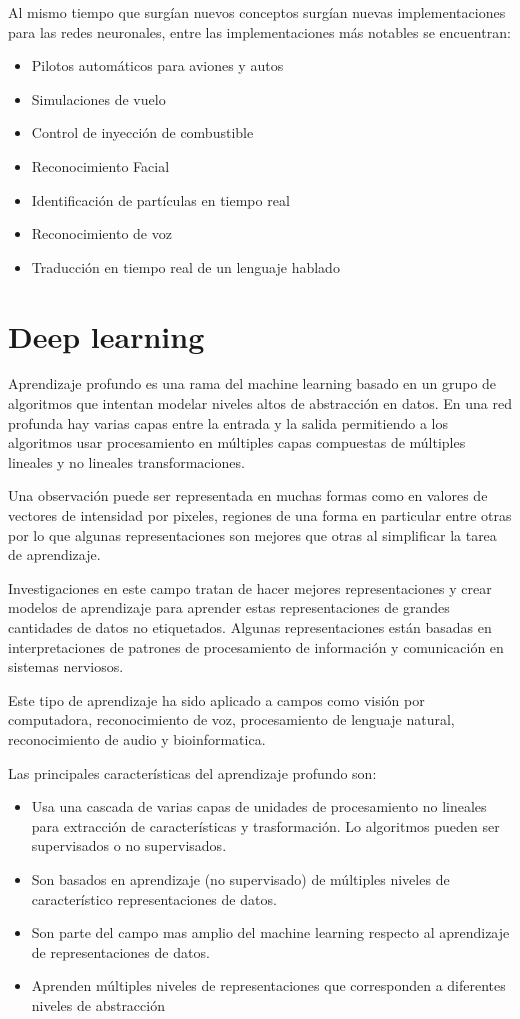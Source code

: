 \documentclass{article}
\begin{document}
Al mismo tiempo que surgían nuevos conceptos surgían nuevas implementaciones para las redes neuronales, entre las implementaciones más notables se encuentran:
\begin{itemize}
	\item Pilotos automáticos para aviones y autos
	\item Simulaciones de vuelo
	\item Control de inyección de combustible
	\item Reconocimiento Facial
	\item Identificación de partículas en tiempo real
	\item Reconocimiento de voz
	\item Traducción en tiempo real de un lenguaje hablado
\end{itemize}
\newpage
\section{Deep learning}
Aprendizaje profundo es una rama del machine learning basado en un grupo de algoritmos que intentan modelar niveles altos de abstracción en datos.
En una red profunda hay varias capas entre la entrada y la salida permitiendo a los algoritmos usar procesamiento en múltiples capas compuestas de múltiples lineales y no lineales transformaciones.

Una observación puede ser representada en muchas formas como en valores de vectores de intensidad por pixeles, regiones de una forma en particular entre otras por lo que algunas representaciones son mejores que otras al simplificar la tarea de aprendizaje.

Investigaciones en este campo tratan de hacer mejores representaciones y crear modelos de aprendizaje para aprender estas representaciones de grandes cantidades de datos no etiquetados. Algunas representaciones están basadas en interpretaciones de patrones de procesamiento de información y comunicación en sistemas nerviosos.

Este tipo de aprendizaje ha sido aplicado a campos como visión por computadora, reconocimiento de voz, procesamiento de lenguaje natural, reconocimiento de audio y bioinformatica.

Las principales características del aprendizaje profundo son:
\begin{itemize}
	\item Usa una cascada de varias capas de unidades de procesamiento no lineales para extracción de características y trasformación. Lo algoritmos pueden ser supervisados o no supervisados.
	\item Son basados en aprendizaje (no supervisado) de múltiples niveles de característico representaciones de datos.
	\item Son parte del campo mas amplio del machine learning respecto al aprendizaje de representaciones de datos.
	\item Aprenden múltiples niveles de representaciones que corresponden a diferentes niveles de abstracción
\end{itemize}
\end{document}
